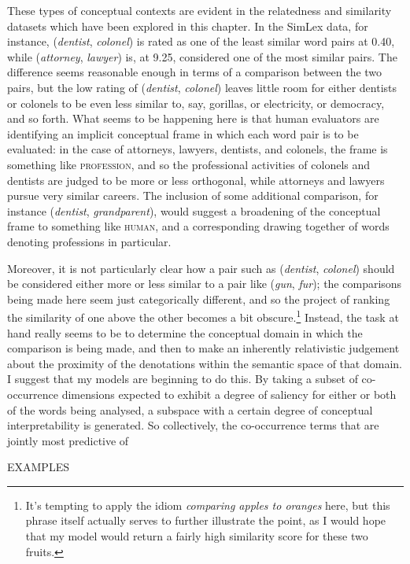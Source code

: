 These types of conceptual contexts are evident in the relatedness and similarity datasets which have been explored in this chapter.  In the SimLex data, for instance, (\emph{dentist}, \emph{colonel}) is rated as one of the least similar word pairs at 0.40, while (\emph{attorney}, \emph{lawyer}) is, at 9.25, considered one of the most similar pairs.  The difference seems reasonable enough in terms of a comparison between the two pairs, but the low rating of (\emph{dentist}, \emph{colonel}) leaves little room for either dentists or colonels to be even less similar to, say, gorillas, or electricity, or democracy, and so forth.  What seems to be happening here is that human evaluators are identifying an implicit conceptual frame in which each word pair is to be evaluated: in the case of attorneys, lawyers, dentists, and colonels, the frame is something like \textsc{profession}, and so the professional activities of colonels and dentists are judged to be more or less orthogonal, while attorneys and lawyers pursue very similar careers.  The inclusion of some additional comparison, for instance (\emph{dentist}, \emph{grandparent}), would suggest a broadening of the conceptual frame to something like \textsc{human}, and a corresponding drawing together of words denoting professions in particular.

Moreover, it is not particularly clear how a pair such as (\emph{dentist}, \emph{colonel}) should be considered either more or less similar to a pair like (\emph{gun}, \emph{fur}); the comparisons being made here seem just categorically different, and so the project of ranking the similarity of one above the other becomes a bit obscure.\footnote{It's tempting to apply the idiom \emph{comparing apples to oranges} here, but this phrase itself actually serves to further illustrate the point, as I would hope that my model would return a fairly high similarity score for these two fruits.}  Instead, the task at hand really seems to be to determine the conceptual domain in which the comparison is being made, and then to make an inherently relativistic judgement about the proximity of the denotations within the semantic space of that domain.  I suggest that my models are beginning to do this.  By taking a subset of co-occurrence dimensions expected to exhibit a degree of saliency for either or both of the words being analysed, a subspace with a certain degree of conceptual interpretability is generated.  So collectively, the co-occurrence terms that are jointly most predictive of 

EXAMPLES

